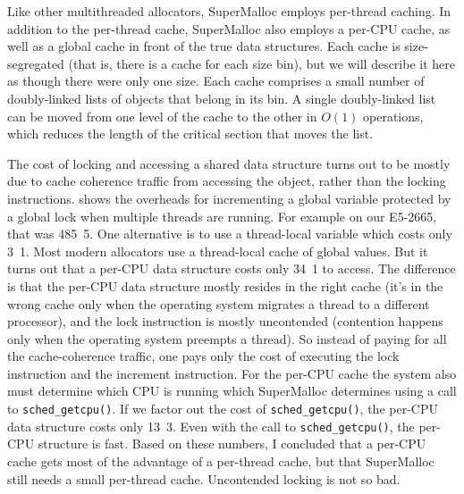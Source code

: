 \documentclass[natbib,sort&compress,10pt]{sigplanconf}
\newcommand{\code}[1]{\texttt{#1}}
\begin{document}

Like other multithreaded allocators, SuperMalloc employs per-thread
caching.  In addition to the per-thread cache, SuperMalloc also
employs a per-CPU cache, as well as a global cache in front of the
true data structures.  Each cache is size-segregated (that is, there
is a cache for each size bin), but we will describe it here as though
there were only one size.  Each cache comprises a small number of
doubly-linked lists of objects that belong in its bin.  A single
doubly-linked list can be moved from one level of the cache to the
other in $O(1)$ operations, which reduces the length of the critical
section that moves the list.

The cost of locking and accessing a shared data structure turns out to
be mostly due to cache coherence traffic from accessing the object,
rather than the locking instructions.   shows the
overheads for incrementing a global variable protected by a global
lock when multiple threads are running.  For example on our E5-2665,
that was \unit{485.5}\nano\second.  One alternative is to use a
thread-local variable which costs only \unit{3.1}\nano\second.  Most
modern allocators use a thread-local cache of global values.  But it
turns out that a per-CPU data structure costs only
\unit{34.1}\nano\second{} to access.  The difference is that the
per-CPU data structure mostly resides in the right cache (it's in the
wrong cache only when the operating system migrates a thread to a
different processor), and the lock instruction is mostly uncontended
(contention happens only when the operating system preempts a thread).
So instead of paying for all the cache-coherence traffic, one pays
only the cost of executing the lock instruction and the increment
instruction.  For the per-CPU cache the system also must determine
which CPU is running which SuperMalloc determines using a call to
\code{sched\_getcpu()}.  If we factor out the cost of
\code{sched\_getcpu()}, the per-CPU data structure costs only
\unit{13.3}\nano\second.  Even with the call to \code{sched\_getcpu()},
the per-CPU structure is fast. Based on these numbers, I concluded
that a per-CPU cache gets most of the advantage of a per-thread cache,
but that SuperMalloc still needs a small per-thread cache.
Uncontended locking is not so bad.
\end{document}
